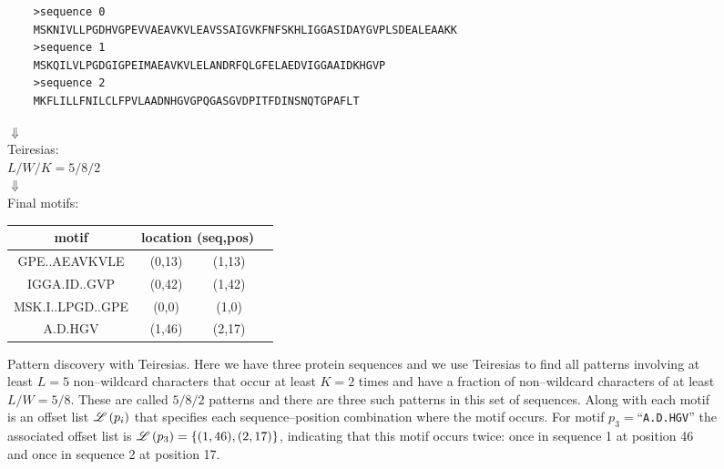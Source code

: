             \begin{figure}[ptb]
\begin{verbatim}
    >sequence 0
    MSKNIVLLPGDHVGPEVVAEAVKVLEAVSSAIGVKFNFSKHLIGGASIDAYGVPLSDEALEAAKK
    >sequence 1
    MSKQILVLPGDGIGPEIMAEAVKVLELANDRFQLGFELAEDVIGGAAIDKHGVP
    >sequence 2
    MKFLILLFNILCLFPVLAADNHGVGPQGASGVDPITFDINSNQTGPAFLT
\end{verbatim}

            \centering
            $\Downarrow$\\
    Teiresias:\\
    $L/W/K = 5/8/2$ \\
            $\Downarrow$\\

            Final motifs:\\

            \begin{tabular}{cccc} \hline\hline
            motif & \multicolumn{2}{c}{location (seq,pos)} \\ \hline
            \ttfamily GPE..AEAVKVLE & (0,13) & (1,13) \\
            \ttfamily IGGA.ID..GVP & (0,42) & (1,42) \\
            \ttfamily MSK.I..LPGD..GPE & (0,0) & (1,0) \\
            \ttfamily A.D.HGV & (1,46) & (2,17)\\ \hline\hline
            \end{tabular}
            \caption[Pattern discovery with Teiresias]{Pattern discovery with Teiresias.  Here we have three protein
            sequences and we use Teiresias to find all patterns involving at least $L=5$ non--wildcard characters that occur
            at least $K=2$ times and have a fraction of non--wildcard characters of at least $L/W=5/8$.  These are called $5/8/2$
            patterns and there are three such patterns in this set of sequences.  Along with each motif is an offset list $\mathscr{L}\left(p_i\right)$
            that specifies each sequence--position combination where the motif occurs.  For motif $p_3=$``\texttt{A.D.HGV}'' the
            associated offset list is $\mathscr{L}\left(p_3\right)=\{(1,46),(2,17)\}$, indicating that this motif occurs twice: once in sequence
            1 at position 46 and once in sequence 2 at position 17.}
            \label{fig:teiresias output}
            \end{figure}

